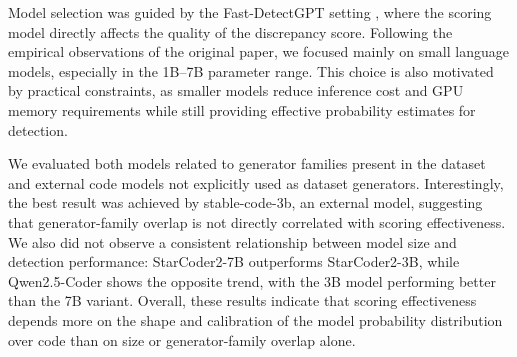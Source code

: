 \documentclass[11pt]{article}
\begin{document}
\begin{table}[htbp]
  \centering
  \small
  \caption{Model selection F1 results for zero-shot Fast-DetectGPT on Task A}
  \label{tab:model_comparison}
\end{table}

Model selection was guided by the Fast-DetectGPT setting \cite{bao2024fastdetectgptefficientzeroshotdetection}, where the scoring model directly affects the quality of the discrepancy score. Following the empirical observations of the original paper, we focused mainly on small language models, especially in the 1B--7B parameter range. This choice is also motivated by practical constraints, as smaller models reduce inference cost and GPU memory requirements while still providing effective probability estimates for detection.

We evaluated both models related to generator families present in the dataset and external code models not explicitly used as dataset generators. Interestingly, the best result was achieved by stable-code-3b, an external model, suggesting that generator-family overlap is not directly correlated with scoring effectiveness. We also did not observe a consistent relationship between model size and detection performance: StarCoder2-7B outperforms StarCoder2-3B, while Qwen2.5-Coder shows the opposite trend, with the 3B model performing better than the 7B variant. Overall, these results indicate that scoring effectiveness depends more on the shape and calibration of the model probability distribution over code than on size or generator-family overlap alone.
\end{document}
